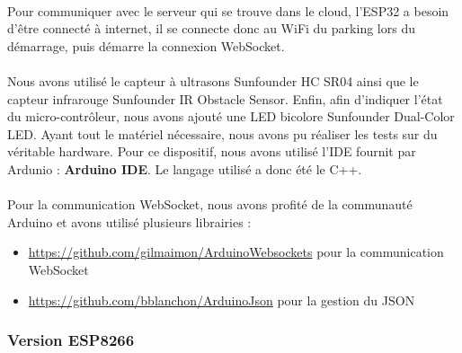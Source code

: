 \paragraph*{}
Pour communiquer avec le serveur qui se trouve dans le cloud, l'ESP32 a besoin d'être connecté à internet, il se connecte donc au WiFi du parking lors du démarrage, puis démarre la connexion WebSocket.


\paragraph*{}
Nous avons utilisé le capteur à ultrasons Sunfounder HC SR04 ainsi que le capteur infrarouge Sunfounder IR Obstacle Sensor. Enfin, afin d'indiquer l'état du micro-contrôleur, nous avons ajouté une LED bicolore Sunfounder Dual-Color LED. Ayant tout le matériel nécessaire, nous avons pu réaliser les tests sur du véritable hardware.
Pour ce dispositif, nous avons utilisé l'IDE fournit par Ardunio : \textbf{Arduino IDE}. Le langage utilisé a donc été le C++. 

\paragraph*{}
Pour la communication WebSocket, nous avons profité de la communauté Arduino et avons utilisé plusieurs librairies :
\begin{itemize}
    \item \url{https://github.com/gilmaimon/ArduinoWebsockets} pour la communication WebSocket
    \item \url{https://github.com/bblanchon/ArduinoJson} pour la gestion du JSON
\end{itemize}


\clearpage
\subsubsection*{Version ESP8266}

